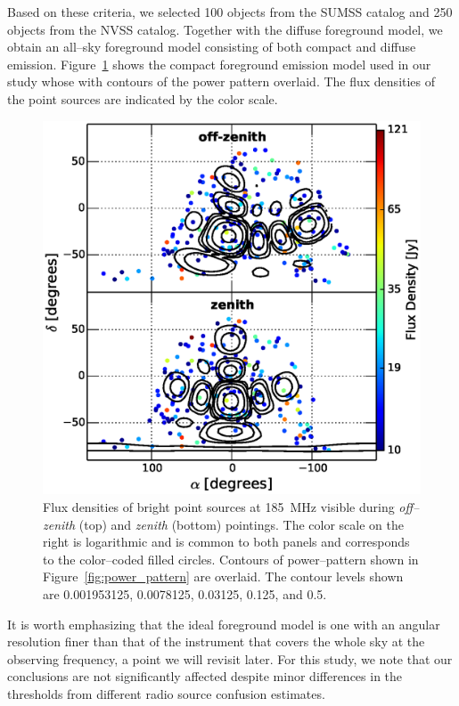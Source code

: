 \documentclass[preprint2,iop,numberedappendix]{emulateapj}
\begin{document}
Based on these criteria, we selected 100 objects from the SUMSS catalog and 250 objects from the NVSS catalog. Together with the diffuse foreground model, we obtain an all--sky foreground model consisting of both compact and diffuse emission. Figure~\ref{fig:CSM} shows the compact foreground emission model used in our study whose with contours of the power pattern overlaid. The flux densities of the point sources are indicated by the color scale. 

\begin{figure}[htb]
\centering
\includegraphics[width=\linewidth]{f6.eps}
\caption{Flux densities of bright point sources at 185~MHz visible during {\it off--zenith} (top) and {\it zenith} (bottom) pointings. The color scale on the right is logarithmic and is common to both panels and corresponds to the color--coded filled circles. Contours of power--pattern shown in Figure~\ref{fig:power_pattern} are overlaid. The contour levels shown are 0.001953125, 0.0078125, 0.03125, 0.125, and 0.5. \label{fig:CSM}}
\end{figure}

It is worth emphasizing that the ideal foreground model is one with an angular resolution finer than that of the instrument that covers the whole sky at the observing frequency, a point we will revisit later. For this study, we note that our conclusions are not significantly affected despite minor differences in the thresholds from different radio source confusion estimates.
\end{document}
